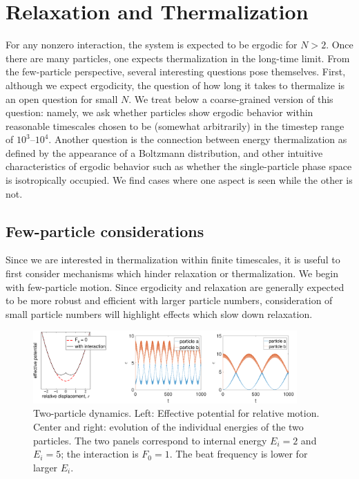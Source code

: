 \documentclass[a4paper, onecolumn]{revtex4-1}
\begin{document}
\section{Relaxation and Thermalization}\label{sec:relaxation}


For any nonzero interaction, the system is expected to be ergodic for $N>2$.  Once there are many
particles, one expects thermalization in the long-time limit.  From the few-particle perspective,
several interesting questions pose themselves.  First, although we expect ergodicity, the question
of how long it takes to thermalize is an open question for small $N$. We treat below a
coarse-grained version of this question: namely, we ask whether particles show ergodic behavior
within reasonable timescales chosen to be (somewhat arbitrarily) in the timestep range of
$10^3$--$10^4$.  Another question is the connection between energy thermalization as defined by the
appearance of a Boltzmann distribution, and other intuitive characteristics of ergodic behavior such
as whether the single-particle phase space is isotropically occupied.  We find cases where one
aspect is seen while the other is not.







\subsection{Few-particle considerations}

Since we are interested in thermalization within finite timescales, it is useful to first consider
mechanisms which hinder relaxation or thermalization.  We begin with few-particle motion.  Since
ergodicity and relaxation are generally expected to be more robust and efficient with larger
particle numbers, consideration of small particle numbers will highlight effects which slow down
relaxation.



\begin{figure}[tb]
\centering
\includegraphics[width=0.9\textwidth]{ZhiyuPictures/two_particles_a_01.pdf}
\caption{Two-particle dynamics.  Left: Effective potential for relative motion.  Center and right:
  evolution of the individual energies of the two particles.  The two panels correspond to internal
  energy $E_i=2$ and $E_i=5$; the interaction is $F_0=1$.  The beat frequency is lower for larger
  $E_i$. }
\label{fig:thermalization2}
\end{figure}
\end{document}

